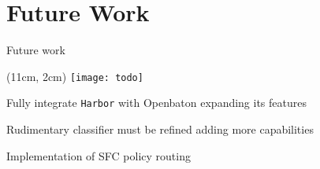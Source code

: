 \section{Future Work}

\begin{frame}{Future work}

  \begin{textblock*}{1cm}(11cm, 2cm)
    \texttt{[image: todo]}
  \end{textblock*}

  Fully integrate \texttt{Harbor} with Openbaton expanding its features

  \vfill{}

  Rudimentary classifier must be refined adding more capabilities

  \vfill{}

  Implementation of SFC policy routing

  \vfill{}

\end{frame}